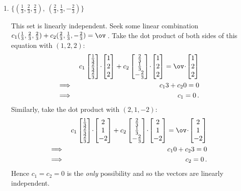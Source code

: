 \begin{example}
\begin{enumerate}
\item \(\{(\frac13,\frac23,\frac23),\ (\frac23,\frac13,-\frac23)\}\)
\begin{solution} 
This set is linearly independent.
Seek some linear combination \(c_1(\frac13,\frac23,\frac23) +c_2(\frac23,\frac13,-\frac23) =\ov\)\,.
Take the dot product of both sides of this equation with \((1,2,2)\):
\begin{eqnarray*}
&&c_1\begin{bmatrix}\frac13\\\frac23\\\frac23 \end{bmatrix}\cdot\begin{bmatrix} 1\\2\\2 \end{bmatrix} +c_2\begin{bmatrix} \frac23\\\frac13\\-\frac23 \end{bmatrix}\cdot\begin{bmatrix} 1\\2\\2 \end{bmatrix} =\ov\cdot\begin{bmatrix} 1\\2\\2 \end{bmatrix}
\\\implies&& c_13+c_20=0
\\\implies&& c_1=0\,.
\end{eqnarray*}
Similarly, take the dot product with \((2,1,-2)\): 
\begin{eqnarray*}
&&c_1\begin{bmatrix}\frac13\\\frac23\\\frac23 \end{bmatrix}\cdot\begin{bmatrix} 2\\1\\-2 \end{bmatrix} +c_2\begin{bmatrix} \frac23\\\frac13\\-\frac23 \end{bmatrix}\cdot\begin{bmatrix} 2\\1\\-2 \end{bmatrix} =\ov\cdot\begin{bmatrix} 2\\1\\-2 \end{bmatrix}
\\\implies&& c_10+c_23=0
\\\implies&& c_2=0\,.
\end{eqnarray*}
Hence \(c_1=c_2=0\) is the \emph{only} possibility and so the vectors are linearly independent.
\end{solution}


\end{enumerate}
\end{example}
